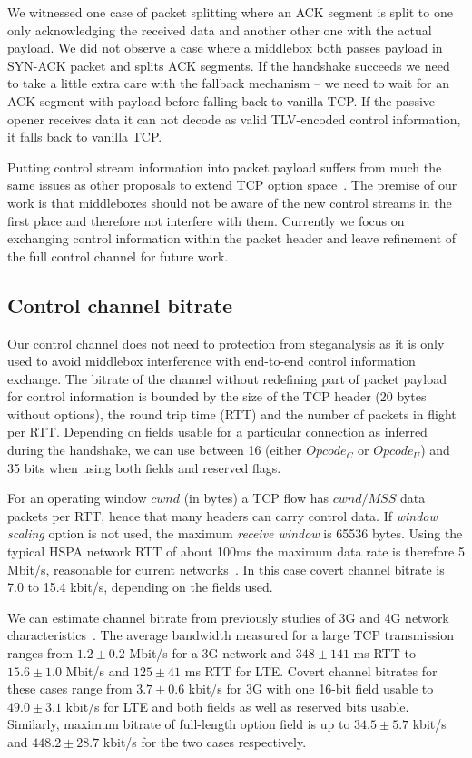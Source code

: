 \documentclass{sig-alternate-10pt}
\begin{document}
We witnessed one case of packet splitting where an ACK segment is split to one only acknowledging the received data and another other one with the actual payload. We did not observe a case where a middlebox both passes payload in SYN-ACK packet and splits ACK segments. If the handshake succeeds we need to take a little extra care with the fallback mechanism -- we need to wait for an ACK segment with payload before falling back to vanilla TCP. If the passive opener receives data it can not decode as valid TLV-encoded control information, it falls back to vanilla TCP.

Putting control stream information into packet payload suffers from much the same issues as other proposals to extend TCP option space~\cite{Ramaiah:2012wa}. The premise of our work is that middleboxes should not be aware of the new control streams in the first place and therefore not interfere with them. Currently we focus on exchanging control information within the packet header and leave refinement of the full control channel for future work.

\subsection{Control channel bitrate}

Our control channel does not need to protection from steganalysis as it is only used to avoid middlebox interference with end-to-end control information exchange. The bitrate of the channel without redefining part of packet payload for control information is bounded by the size of the TCP header (20 bytes without options), the round trip time (RTT) and the number of packets in flight per RTT. Depending on fields usable for a particular connection as inferred during the handshake, we can use between 16 (either $Opcode_C$ or $Opcode_U$) and 35 bits when using both fields and reserved flags.

For an operating window $cwnd$ (in bytes) a TCP flow has $cwnd/MSS$ data packets per RTT, hence that many headers can carry control data. If \emph{window scaling} option is not used, the maximum \emph{receive window} is 65536 bytes. Using the typical HSPA network RTT of about 100ms the maximum data rate is therefore 5 Mbit/s, reasonable for current networks~\cite{Chen:2012vj}. In this case covert channel bitrate is 7.0 to 15.4 kbit/s, depending on the fields used.

We can estimate channel bitrate from previously studies of 3G and 4G network characteristics~\cite{Chen:2012vj}. The average bandwidth measured for a large TCP transmission ranges from $1.2\pm 0.2$ Mbit/s for a 3G network and $348\pm 141$ ms RTT to $15.6\pm 1.0$ Mbit/s and $125\pm 41$ ms RTT for LTE. Covert channel bitrates for these cases range from $3.7 \pm 0.6$ kbit/s for 3G with one 16-bit field usable to $49.0 \pm 3.1$ kbit/s for LTE and both fields as well as reserved bits usable. Similarly, maximum bitrate of full-length option field is up to $34.5 \pm 5.7$ kbit/s and $448.2 \pm 28.7$ kbit/s for the two cases respectively.
\end{document}
